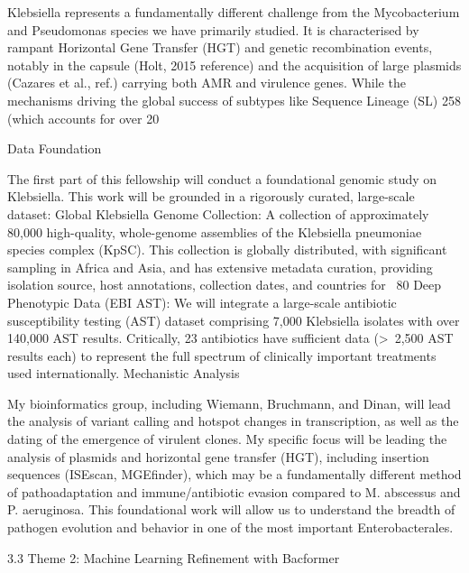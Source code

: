 Klebsiella represents a fundamentally different challenge from the Mycobacterium and Pseudomonas species we have primarily studied. It is characterised by rampant Horizontal Gene Transfer (HGT) and genetic recombination events, notably in the capsule (Holt, 2015 reference) and the acquisition of large plasmids (Cazares et al., ref.) carrying both AMR and virulence genes. While the mechanisms driving the global success of subtypes like Sequence Lineage (SL) 258 (which accounts for over 20%

Data Foundation

The first part of this fellowship will conduct a foundational genomic study on Klebsiella. This work will be grounded in a rigorously curated, large-scale dataset:
Global Klebsiella Genome Collection: A collection of approximately 80,000 high-quality, whole-genome assemblies of the Klebsiella pneumoniae species complex (KpSC). This collection is globally distributed, with significant sampling in Africa and Asia, and has extensive metadata curation, providing isolation source, host annotations, collection dates, and countries for ~80%
Deep Phenotypic Data (EBI AST): We will integrate a large-scale antibiotic susceptibility testing (AST) dataset comprising 7,000 Klebsiella isolates with over 140,000 AST results. Critically, 23 antibiotics have sufficient data (>~2,500 AST results each) to represent the full spectrum of clinically important treatments used internationally.
Mechanistic Analysis

My bioinformatics group, including Wiemann, Bruchmann, and Dinan, will lead the analysis of variant calling and hotspot changes in transcription, as well as the dating of the emergence of virulent clones. My specific focus will be leading the analysis of plasmids and horizontal gene transfer (HGT), including insertion sequences (ISEscan, MGEfinder), which may be a fundamentally different method of pathoadaptation and immune/antibiotic evasion compared to M. abscessus and P. aeruginosa. This foundational work will allow us to understand the breadth of pathogen evolution and behavior in one of the most important Enterobacterales.

3.3 Theme 2: Machine Learning Refinement with Bacformer

